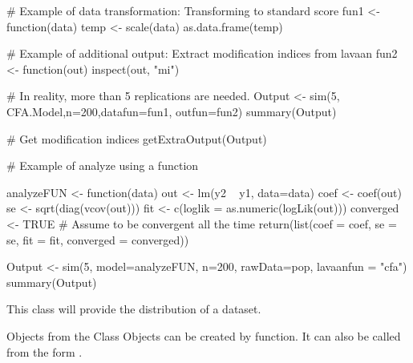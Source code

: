 \documentclass[a4paper]{book}
\begin{document}
\begin{Examples}
\begin{ExampleCode}
# Example of data transformation: Transforming to standard score
fun1 <- function(data) {
	temp <- scale(data)
	as.data.frame(temp)
}

# Example of additional output: Extract modification indices from lavaan
fun2 <- function(out) {
	inspect(out, "mi")
}

# In reality, more than 5 replications are needed.
Output <- sim(5, CFA.Model,n=200,datafun=fun1, outfun=fun2)
summary(Output)

# Get modification indices
getExtraOutput(Output)

# Example of analyze using a function

analyzeFUN <- function(data) {
	out <- lm(y2 ~ y1, data=data)
	coef <- coef(out)
	se <- sqrt(diag(vcov(out)))
	fit <- c(loglik = as.numeric(logLik(out)))
	converged <- TRUE # Assume to be convergent all the time
	return(list(coef = coef, se = se, fit = fit, converged = converged))
}

Output <- sim(5, model=analyzeFUN, n=200, rawData=pop, lavaanfun = "cfa")
summary(Output)
\end{ExampleCode}
\end{Examples}
%
\begin{Description}\relax
This class will provide the distribution of a dataset.
\end{Description}
%
\begin{Section}{Objects from the Class}
Objects can be created by  function. It can also be called from the form .
\end{Section}
%
\end{document}
